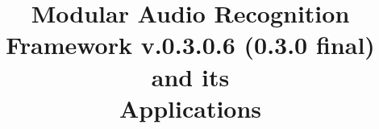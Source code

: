 \documentclass[letterpaper,11pt]{report}
\title{Modular Audio Recognition Framework v.0.3.0.6 (0.3.0 final)\\and its\\Applications}
\date{}
\begin{document}
	\begin{titlepage}
		\maketitle
	\end{titlepage}

	
	
	
	
	
	
	
	
	
	
	
	
	
	
	

	\printindex
\end{document}
